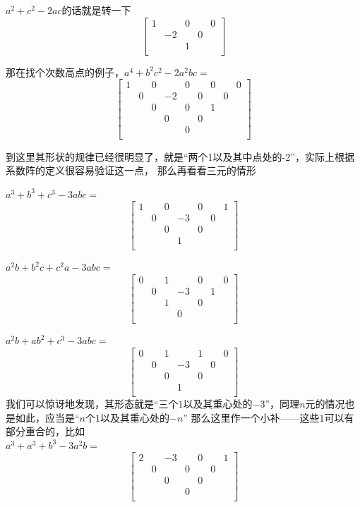 \documentclass[UTF8]{ctexart}
\begin{document}
$ a^{2}+c^{2}-2ac $的话就是转一下
\renewcommand*{\arraystretch}{1.732}\[\left[\begin{matrix}
	1& & 0& &0 \\
	& -2& &0 & \\
	& & 1& & \\
\end{matrix}\right]\]

那在找个次数高点的例子，$ a^{4}+b^{2}c^{2}-2a^{2}bc= $
\renewcommand*{\arraystretch}{1.732}\[\left[\begin{matrix}
	1& & 0& &0& & 0& &0\\
    & 0& & -2&&0 & & 0&\\
    & & 0& &0& & 1& &\\
    & & & 0&& 0& & &\\
    & & & &0& & & &\\
\end{matrix}\right]\]

到这里其形状的规律已经很明显了，就是“两个1以及其中点处的-2”，实际上根据系数阵的定义很容易验证这一点，
那么再看看三元的情形

$ a^{3}+b^{3}+c^{3}-3abc= $
\renewcommand*{\arraystretch}{1.732}\[\left[\begin{matrix}
	1& & 0& &0& & 1\\
	& 0& & -3& &0 &\\
	& & 0& &0& & \\
	& & & 1& & &\\
\end{matrix}\right]\]

$ a^{2}b+b^{2}c+c^{2}a-3abc= $
\renewcommand*{\arraystretch}{1}\[\left[\begin{matrix}
	0& & 1& &0& & 0\\
	& 0& & -3& &1 &\\
	& & 1& &0& & \\
	& & & 0& & &\\
\end{matrix}\right]\]

$ a^{2}b+ab^{2}+c^{3}-3abc= $
\renewcommand*{\arraystretch}{1.732}\[\left[\begin{matrix}
	0& & 1& &1& & 0\\
	& 0& & -3& &0 &\\
	& & 0& &0& & \\
	& & & 1& & &\\
\end{matrix}\right]\]
我们可以惊讶地发现，其形态就是“三个$ 1 $以及其重心处的$ -3 $”，同理$ n $元的情况也是如此，应当是“$ n $个$ 1 $以及其重心处的$ -n $”
那么这里作一个小补——这些$ 1 $可以有部分重合的，比如\\
$ a^{3}+a^{3}+b^{3}-3a^{2}b= $
\renewcommand*{\arraystretch}{1.732}\[\left[\begin{matrix}
	2& & -3& &0& & 1\\
	& 0& & 0& &0 &\\
	& & 0& &0& & \\
	& & & 0& & &\\
\end{matrix}\right]\]
\end{document}
